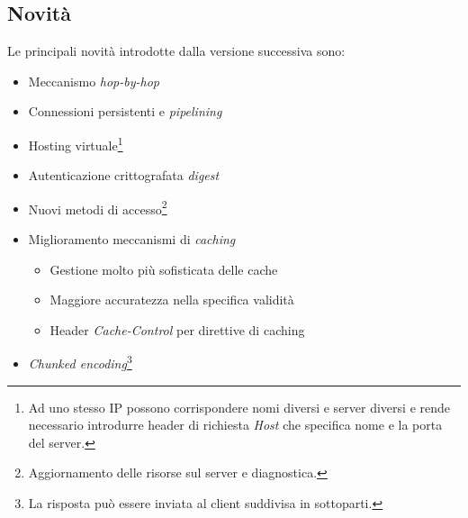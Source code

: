 \documentclass[a4paper,11pt]{article}
\begin{document}
\subsection{Novità}
Le principali novità introdotte dalla versione successiva sono:
\begin{itemize}
    \item Meccanismo \textit{hop-by-hop}
    \item Connessioni persistenti e \textit{pipelining}
    \item Hosting virtuale\footnote{Ad uno stesso IP possono corrispondere nomi diversi e server diversi e rende necessario introdurre header di richiesta \textit{Host} che specifica nome e la porta del server.}
    \item Autenticazione crittografata \textit{digest}
    \item Nuovi metodi di accesso\footnote{Aggiornamento delle risorse sul server e diagnostica.}
    \item Miglioramento meccanismi di \textit{caching}
    \begin{itemize}
        \item Gestione molto più sofisticata delle cache
        \item Maggiore accuratezza nella specifica validità
        \item Header \textit{Cache-Control} per direttive di caching
    \end{itemize}
    \item \textit{Chunked encoding}\footnote{La risposta può essere inviata al client suddivisa in sottoparti.}
\end{itemize}
\end{document}
